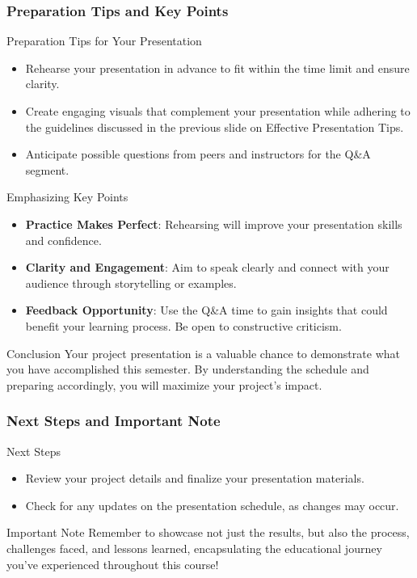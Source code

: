 \documentclass[aspectratio=169]{beamer}
\begin{document}
\begin{frame}[fragile]
    \frametitle{Preparation Tips and Key Points}
    \begin{block}{Preparation Tips for Your Presentation}
        \begin{itemize}
            \item Rehearse your presentation in advance to fit within the time limit and ensure clarity.
            \item Create engaging visuals that complement your presentation while adhering to the guidelines discussed in the previous slide on Effective Presentation Tips.
            \item Anticipate possible questions from peers and instructors for the Q\&A segment.
        \end{itemize}
    \end{block}

    \begin{block}{Emphasizing Key Points}
        \begin{itemize}
            \item \textbf{Practice Makes Perfect}: Rehearsing will improve your presentation skills and confidence.
            \item \textbf{Clarity and Engagement}: Aim to speak clearly and connect with your audience through storytelling or examples.
            \item \textbf{Feedback Opportunity}: Use the Q\&A time to gain insights that could benefit your learning process. Be open to constructive criticism.
        \end{itemize}
    \end{block}

    \begin{block}{Conclusion}
        Your project presentation is a valuable chance to demonstrate what you have accomplished this semester. By understanding the schedule and preparing accordingly, you will maximize your project's impact.
    \end{block}
\end{frame}

\begin{frame}[fragile]
    \frametitle{Next Steps and Important Note}
    \begin{block}{Next Steps}
        \begin{itemize}
            \item Review your project details and finalize your presentation materials.
            \item Check for any updates on the presentation schedule, as changes may occur.
        \end{itemize}
    \end{block}

    \begin{block}{Important Note}
    Remember to showcase not just the results, but also the process, challenges faced, and lessons learned, encapsulating the educational journey you've experienced throughout this course!
    \end{block}
\end{frame}
\end{document}
